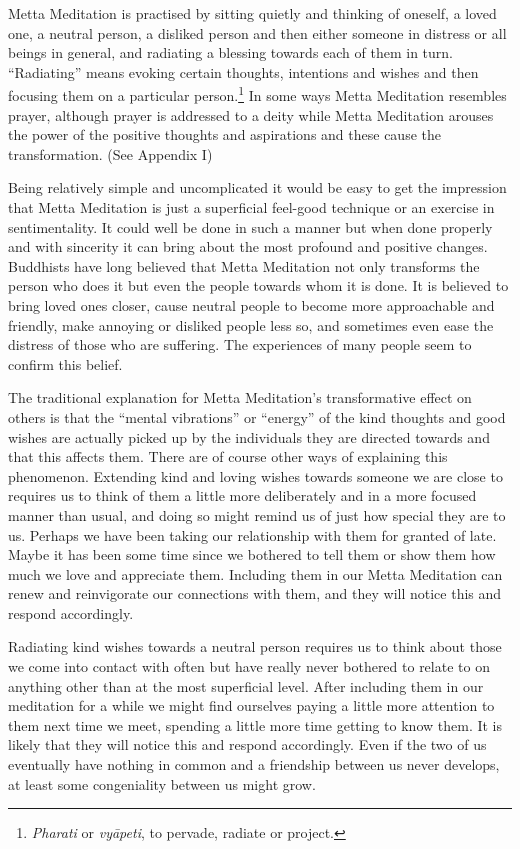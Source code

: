 \documentclass[10pt, openright]{book}
\begin{document}
Metta Meditation is practised by sitting quietly and thinking of oneself, a loved one, a neutral person, a disliked person and then either someone in distress or all beings in general, and radiating a blessing towards each of them in turn. “Radiating” means evoking certain thoughts, intentions and wishes and then focusing them on a particular person.\footnote {\textit{Pharati} or \textit{vyāpeti}, to pervade, radiate or project.} In some ways Metta Meditation resembles prayer, although prayer is addressed to a deity while Metta Meditation arouses the power of the positive thoughts and aspirations and these cause the transformation. (See Appendix I)


Being relatively simple and uncomplicated it would be easy to get the impression that Metta Meditation is just a superficial feel-good technique or an exercise in sentimentality. It could well be done in such a manner but when done properly and with sincerity it can bring about the most profound and positive changes. Buddhists have long believed that Metta Meditation not only transforms the person who does it but even the people towards whom it is done. It is believed to bring loved ones closer, cause neutral people to become more approachable and friendly, make annoying or disliked people less so, and sometimes even ease the distress of those who are suffering. The experiences of many people seem to confirm this belief.


The traditional explanation for Metta Meditation’s transformative effect on others is that the “mental vibrations” or “energy” of the kind thoughts and good wishes are actually picked up by the individuals they are directed towards and that this affects them. There are of course other ways of explaining this phenomenon. Extending kind and loving wishes towards someone we are close to requires us to think of them a little more deliberately and in a more focused manner than usual, and doing so might remind us of just how special they are to us. Perhaps we have been taking our relationship with them for granted of late. Maybe it has been some time since we bothered to tell them or show them how much we love and appreciate them. Including them in our Metta Meditation can renew and reinvigorate our connections with them, and they will notice this and respond accordingly.


Radiating kind wishes towards a neutral person requires us to think about those we come into contact with often but have really never bothered to relate to on anything other than at the most superficial level. After including them in our meditation for a while we might find ourselves paying a little more attention to them next time we meet, spending a little more time getting to know them. It is likely that they will notice this and respond accordingly. Even if the two of us eventually have nothing in common and a friendship between us never develops, at least some congeniality between us might grow.
\end{document}
